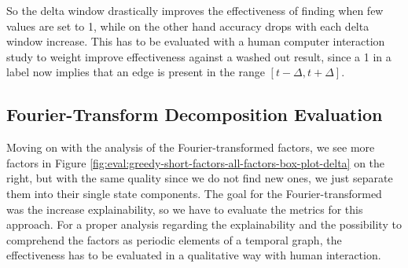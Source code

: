 So the delta window drastically improves the effectiveness of finding \orDecomp when few values are set to 1, while on the other hand accuracy drops with each delta window increase.
This has to be evaluated with a human computer interaction study to weight improve effectiveness against a washed out result, since a 1 in a label now implies that an edge is present in the range  $[t - \Delta, t + \Delta]$.

\subsection{Fourier-Transform Decomposition Evaluation}
\label{ch:Evaluation:decomposition-quality:fourier}
Moving on with the analysis of the Fourier-transformed factors, we see more factors in Figure \ref{fig:eval:greedy-short-factors-all-factors-box-plot-delta} on the right, but with the same quality since we do not find new ones, we just separate them into their  single state components.
The goal for the Fourier-transformed \orDecomp was the increase explainability, so we have to evaluate the metrics for this approach.
For a proper analysis regarding the explainability and the possibility to comprehend the factors as periodic elements of a temporal graph, the effectiveness has to be evaluated in a qualitative way with human interaction.

